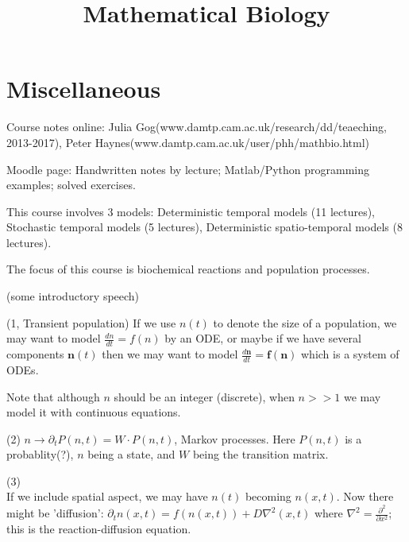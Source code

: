 \documentclass[a4paper]{article}
\begin{document}
\title{Mathematical Biology}

\maketitle

\newpage

\tableofcontents

\newpage

\section{Miscellaneous}

Course notes online: Julia Gog(www.damtp.cam.ac.uk/research/dd/teaeching, 2013-2017), Peter Haynes(www.damtp.cam.ac.uk/user/phh/mathbio.html)

Moodle page: Handwritten notes by lecture; Matlab/Python programming examples; solved exercises.

This course involves 3 models: Deterministic temporal models (11 lectures), Stochastic temporal models (5 lectures), Deterministic spatio-temporal models (8 lectures).

The focus of this course is biochemical reactions and population processes.

(some introductory speech)

\begin{eg} (1, Transient population)
If we use $n(t)$ to denote the size of a population, we may want to model $\frac{dn}{dt} = f(n)$ by an ODE, or maybe if we have several components $\mathbf{n}(t)$ then we may want to model $\frac{d\mathbf{n}}{dt} = \mathbf{f}(\mathbf{n})$ which is a system of ODEs.

Note that although $n$ should be an integer (discrete), when $n >> 1$ we may model it with continuous equations.
\end{eg}

\begin{eg} (2)
$n \to \partial_t P(n,t) = W \cdot P(n,t)$, Markov processes. Here $P(n,t)$ is a probablity(?), $n$ being a state, and $W$ being the transition matrix.
\end{eg}

\begin{eg} (3)\\
If we include spatial aspect, we may have $n(t)$ becoming $n(x,t)$. Now there might be 'diffusion': $\partial_t n(x,t) = f(n(x,t)) + D \nabla^2 (x,t)$ where $\nabla^2 = \frac{\partial^2}{\partial x^2}$; this is the reaction-diffusion equation.
\end{eg}
\end{document}
